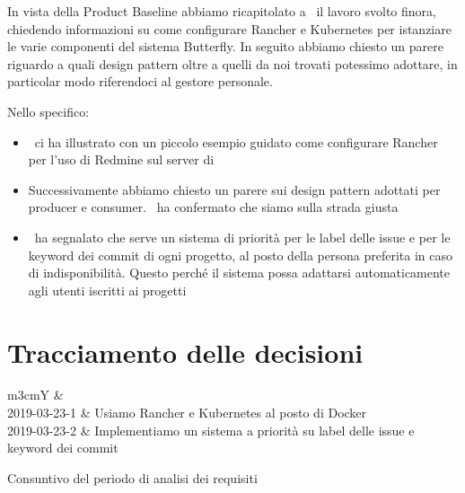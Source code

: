         In vista della Product Baseline abbiamo ricapitolato a \DZ~il lavoro svolto finora, chiedendo informazioni su come configurare Rancher e Kubernetes per istanziare le varie componenti del sistema Butterfly.
        In seguito abbiamo chiesto un parere riguardo a quali design pattern oltre a quelli da noi trovati potessimo adottare, in particolar modo riferendoci al gestore personale.
        
        
        Nello specifico:
        \begin{itemize}
            \item \DZ~ci ha illustrato con un piccolo esempio guidato come configurare Rancher per l'uso di Redmine sul server di \II
            \item Successivamente abbiamo chiesto un parere sui design pattern adottati per producer e consumer. \DZ~ha confermato che siamo sulla strada giusta
            \item \DZ~ha segnalato che serve un sistema di priorità per le label delle issue e per le keyword dei commit di ogni progetto, al posto della persona preferita in caso di indisponibilità. Questo perché il sistema possa adattarsi automaticamente agli utenti iscritti ai progetti
        \end{itemize}
        
    \section{Tracciamento delle decisioni}
    
        \begin{table}[H]
		    \begin{detailtable}{\columnwidth}{m{3cm}Y}
			     &
			    \\\toprule\rowcolor{\tablegray}
			    2019-03-23-1 & Usiamo Rancher e Kubernetes al posto di Docker\\
			    2019-03-23-2 & Implementiamo un sistema a priorità su label delle issue e keyword dei commit\\\bottomrule
		    \end{detailtable}
		    \caption{Consuntivo del periodo di analisi dei requisiti}
	    \end{table}
    	

